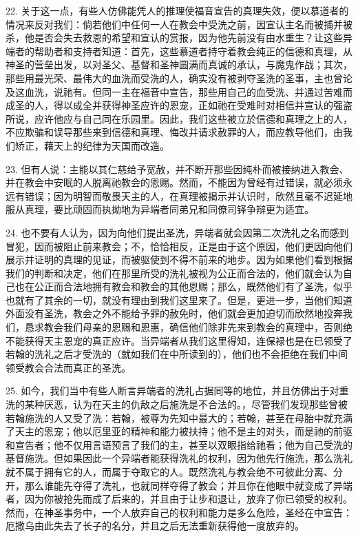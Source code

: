 22. 关于这一点，有些人仿佛能凭人的推理使福音宣告的真理失效，便以慕道者的情况来反对我们：倘若他们中任何一人在教会中受洗之前，因宣认主名而被捕并被杀，他是否会失去救恩的希望和宣认的赏报，因为他先前没有由水重生？让这些异端者的帮助者和支持者知道：首先，这些慕道者持守着教会纯正的信德和真理，从神圣的营垒出发，以对圣父、基督和圣神圆满而真诚的承认，与魔鬼作战；其次，那些用最光荣、最伟大的血洗而受洗的人，确实没有被剥夺圣洗的圣事，主也曾论及这血洗，说祂有。但同一主在福音中宣告，那些用自己的血受洗、并通过苦难而成圣的人，得以成全并获得神圣应许的恩宠，正如祂在受难时对相信并宣认的强盗所说，应许他应与自己同在乐园里。因此，我们这些被立於信德和真理之上的人，不应欺骗和误导那些来到信德和真理、悔改并请求赦罪的人，而应教导他们，由我们矫正，藉天上的纪律为天国而改造。\par

23. 但有人说：主能以其仁慈给予宽赦，并不断开那些因纯朴而被接纳进入教会、并在教会中安眠的人脱离祂教会的恩赐。然而，不能因为曾经有过错误，就必须永远有错误；因为明智而敬畏天主的人，在真理被揭示并认识时，欣然且毫不迟延地服从真理，要比顽固而执拗地为异端者同弟兄和同僚司铎争辩更为适宜。\par

24. 也不要有人认为，因为向他们提出圣洗，异端者就会因第二次洗礼之名而感到冒犯，因而被阻止前来教会；不，恰恰相反，正是由于这个原因，他们更因向他们展示并证明的真理的见证，而被驱使到不得不前来的地步。因为如果他们看到根据我们的判断和决定，他们在那里所受的洗礼被视为公正而合法的，他们就会认为自己也在公正而合法地拥有教会和教会的其他恩赐；那么，既然他们有了圣洗，似乎也就有了其余的一切，就没有理由到我们这里来了。但是，更进一步，当他们知道外面没有圣洗，教会之外不能给予罪的赦免时，他们就会更加迫切而欣然地投奔我们，恳求教会我们母亲的恩赐和恩惠，确信他们除非先来到教会的真理中，否则绝不能获得天主恩宠的真正应许。当异端者从我们这里得知，连保禄也是在已领受了若翰的洗礼之后才受洗的（就如我们在中所读到的），他们也不会拒绝在我们中间领受教会合法而真正的圣洗。\par

25. 如今，我们当中有些人断言异端者的洗礼占据同等的地位，并且仿佛出于对重洗的某种厌恶，认为在天主的仇敌之后施洗是不合法的。，尽管我们发现那些曾被若翰施洗的人又受了洗：若翰，被尊为先知中最大的；若翰，甚至在母胎中就充满了天主的恩宠；他以厄里亚的精神和能力被扶持；他不是主的对头，而是祂的前驱和宣告者；他不仅用言语预言了我们的主，甚至以双眼指给祂看；他为自己受洗的基督施洗。但如果因此一个异端者能获得洗礼的权利，因为他先行施洗，那么洗礼就不属于拥有它的人，而属于夺取它的人。既然洗礼与教会绝不可彼此分离、分开，那么谁能先夺得了洗礼，也就同样夺得了教会；并且你在他眼中就变成了异端者，因为你被抢先而成了后来的，并且由于让步和退让，放弃了你已领受的权利。然而，在神圣事务中，一个人放弃自己的权利和能力是多么危险，圣经在中宣告：厄撒乌由此失去了长子的名分，并且之后无法重新获得他一度放弃的。\par

